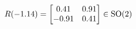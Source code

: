 \documentclass[preview]{standalone}
\begin{document}
\begin{align*}
\special{dvisvgm:raw <g id='unique000'>}R(-1.14) = \begin{bmatrix} 0.41 & 0.91 \\ -0.91 & 0.41 \end{bmatrix} \in \text{SO}(2)\special{dvisvgm:raw </g>}
\end{align*}
\end{document}
